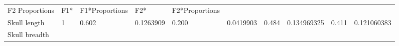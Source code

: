 \documentclass[11pt]{article}
\begin{document}
\begin{longtable}[]{@{}llllllllll@{}}
\begin{minipage}[t]{0.07\columnwidth}
F2 Proportions\strut
\end{minipage} & \begin{minipage}[t]{0.07\columnwidth}\raggedright
F1*\strut
\end{minipage} & \begin{minipage}[t]{0.07\columnwidth}\raggedright
F1*Proportions\strut
\end{minipage} & \begin{minipage}[t]{0.07\columnwidth}\raggedright
F2*\strut
\end{minipage} & \begin{minipage}[t]{0.07\columnwidth}\raggedright
F2*Proportions\strut
\end{minipage}\tabularnewline
\begin{minipage}[t]{0.07\columnwidth}\raggedright
Skull length\strut
\end{minipage} & \begin{minipage}[t]{0.07\columnwidth}\raggedright
1\strut
\end{minipage} & \begin{minipage}[t]{0.07\columnwidth}\raggedright
0.602\strut
\end{minipage} & \begin{minipage}[t]{0.07\columnwidth}\raggedright
0.1263909\strut
\end{minipage} & \begin{minipage}[t]{0.07\columnwidth}\raggedright
0.200\strut
\end{minipage} & \begin{minipage}[t]{0.07\columnwidth}\raggedright
0.0419903\strut
\end{minipage} & \begin{minipage}[t]{0.07\columnwidth}\raggedright
0.484\strut
\end{minipage} & \begin{minipage}[t]{0.07\columnwidth}\raggedright
0.134969325\strut
\end{minipage} & \begin{minipage}[t]{0.07\columnwidth}\raggedright
0.411\strut
\end{minipage} & \begin{minipage}[t]{0.07\columnwidth}\raggedright
0.121060383\strut
\end{minipage}\tabularnewline
\begin{minipage}[t]{0.07\columnwidth}\raggedright
Skull breadth\strut
\end{minipage} & \begin{minipage}[t]{0.07\columnwidth}\raggedright

\end{minipage}
\end{longtable}
\end{document}
